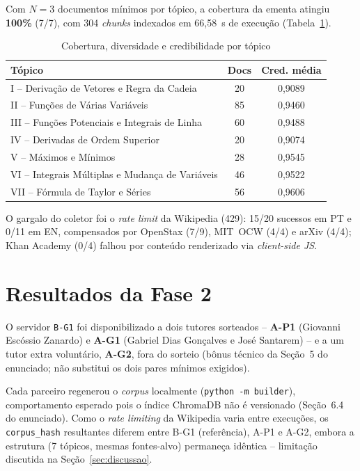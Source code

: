 \documentclass[12pt]{article}
\begin{document}
Com $N=3$ documentos mínimos por tópico, a cobertura da ementa atingiu \textbf{100\%} (7/7), com
304 \textit{chunks} indexados em 66,58~s de execução (Tabela~\ref{tab:cobertura}).

\begin{table}[h]
\centering
\caption{Cobertura, diversidade e credibilidade por tópico}
\label{tab:cobertura}
\small
\begin{tabularx}{\linewidth}{X c c}
\toprule
\textbf{Tópico} & \textbf{Docs} & \textbf{Cred. média} \\
\midrule
I -- Derivação de Vetores e Regra da Cadeia & 20 & 0,9089 \\
II -- Funções de Várias Variáveis & 85 & 0,9460 \\
III -- Funções Potenciais e Integrais de Linha & 60 & 0,9488 \\
IV -- Derivadas de Ordem Superior & 20 & 0,9074 \\
V -- Máximos e Mínimos & 28 & 0,9545 \\
VI -- Integrais Múltiplas e Mudança de Variáveis & 46 & 0,9522 \\
VII -- Fórmula de Taylor e Séries & 56 & 0,9606 \\
\bottomrule
\end{tabularx}
\end{table}

O gargalo do coletor foi o \textit{rate limit} da Wikipedia (429): 15/20 sucessos em PT e 0/11 em
EN, compensados por OpenStax (7/9), MIT~OCW (4/4) e arXiv (4/4); Khan Academy (0/4) falhou por
conteúdo renderizado via \textit{client-side JS}.

\section{Resultados da Fase 2}

O servidor \texttt{B-G1} foi disponibilizado a dois tutores sorteados -- \textbf{A-P1} (Giovanni
Escóssio Zanardo) e \textbf{A-G1} (Gabriel Dias Gonçalves e José Santarem) -- e a um tutor extra
voluntário, \textbf{A-G2}, fora do sorteio (bônus técnico da Seção~5 do enunciado; não substitui os
dois pares mínimos exigidos).

Cada parceiro regenerou o \textit{corpus} localmente (\texttt{python~-m~builder}), comportamento
esperado pois o índice ChromaDB não é versionado (Seção~6.4 do enunciado). Como o \textit{rate
limiting} da Wikipedia varia entre execuções, os \texttt{corpus\_hash} resultantes diferem entre
B-G1 (referência), A-P1 e A-G2, embora a estrutura (7 tópicos, mesmas fontes-alvo) permaneça
idêntica -- limitação discutida na Seção~\ref{sec:discussao}.
\end{document}
